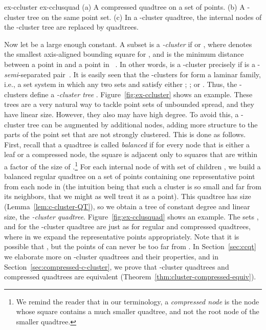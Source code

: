 \documentclass[11pt]{paper}
\begin{document}
  
     {ex-ccluster} {ex-cclusquad} 
    { (a) A compressed quadtree on a set of  points.
      (b) A -cluster tree on the same point set.
      (c) In a -cluster quadtree, the internal nodes of the -cluster tree are replaced by quadtrees.      
    }    

    Now let  be a large enough constant.
    A subset  is a \emph{-cluster} if  or
    , where  denotes the
    smallest axis-aligned bounding square
    for , and  is the minimum distance between a point in 
    and a point in ~\cite{KrznaricLe95,KrznaricLe98}. In other words, 
     is a -cluster precisely if  is a
    -\emph{semi}-separated pair~\cite{HarPeled11,Varadarajan98}.
    It is easily seen that the -clusters for  form a laminar
    family, i.e., a set system in which any two sets  and   satisfy either
    ; ; or .
    Thus, the -clusters define a \emph{-cluster tree} .
    Figure~\ref {fig:ex-ccluster} shows an example.
    These trees are a very natural way to tackle
    point sets of unbounded spread, and they have linear size. However,
    they also may have high degree. To avoid this, a -cluster tree
     can be augmented by additional nodes, adding more structure
    to the parts of the point set that are not strongly clustered.
    This is done as follows. First, recall that a 
      quadtree is called \emph {balanced} if for every node 
       that is either a leaf or a compressed node,
     the square  is adjacent only to squares that are within a factor 
     of the size of .\footnote{We remind the reader that in our 
     terminology,
     a \emph{compressed node} is the node whose square contains a much
     smaller quadtree, and not the root node of the smaller quadtree.}
    For each
    internal node  of  with set of children , we
    build a balanced regular quadtree on a set of points
    containing one representative point from each node in 
    (the intuition being that such a cluster is so small and far from its
    neighbors, that we might as well treat it as a point). This
    quadtree has size  (Lemma~\ref{lem:c-cluster-QT}), so
    we obtain a tree of constant degree and linear size,
    the \emph {-cluster quadtree}.
    Figure~\ref {fig:ex-cclusquad} shows an example.
    The sets ,  and 
    for the -cluster quadtree are just as for regular and compressed
    quadtrees, where in  we expand the representative points
    appropriately.
    Note that it is possible that , but the points 
    of  can never be too far from .
    In Section~\ref {sec:ccqt} we elaborate more on -cluster quadtrees 
    and their properties, and in Section~\ref{sec:compressed-c-cluster}, 
    we prove that -cluster quadtrees and compressed quadtrees
    are equivalent (Theorem~\ref{thm:cluster-compressed-equiv}). 
\end{document}
